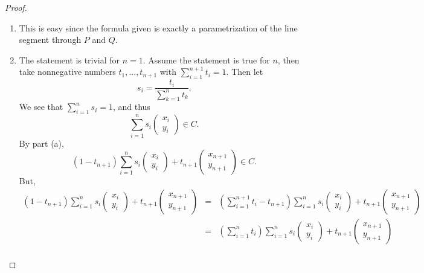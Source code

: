 \begin{proof}
    \begin{enumerate}
        \item This is easy since the formula given is exactly a parametrization of the line segment through $P$ and $Q$.
        \item The statement is trivial for $n=1$. Assume the statement is true for $n$, then take nonnegative numbers $t_1,...,t_{n+1}$ with $\sum_{i=1}^{n+1} t_i = 1$. Then let 
        $$s_i = \frac{t_i}{\sum_{k=1}^n t_k}.$$
        We see that $\sum_{i=1}^n s_i = 1$, and thus
        $$\sum_{i=1}^n s_i \left(\begin{array}{c} x_i\\ y_i\end{array}\right)\in C.$$
        By part (a), 
    $$(1 - t_{n+1})\sum_{i=1}^n s_i \left(\begin{array}{c} x_i\\ y_i\end{array}\right) + t_{n+1}\left(\begin{array}{c} x_{n+1}\\ y_{n+1}\end{array}\right)\in C.$$
    But,
    \begin{eqnarray*}
        (1 - t_{n+1})\sum_{i=1}^n s_i \left(\begin{array}{c} x_i\\ y_i\end{array}\right) + t_{n+1}\left(\begin{array}{c} x_{n+1}\\ y_{n+1}\end{array}\right)
        & = & \left(\sum_{i=1}^{n+1} t_i - t_{n+1}\right)\sum_{i=1}^n s_i \left(\begin{array}{c} x_i\\ y_i\end{array}\right) + t_{n+1}\left(\begin{array}{c} x_{n+1}\\ y_{n+1}\end{array}\right)\\
        & = & \left(\sum_{i=1}^n t_i\right)\sum_{i=1}^n s_i \left(\begin{array}{c} x_i\\ y_i\end{array}\right) + t_{n+1}\left(\begin{array}{c} x_{n+1}\\ y_{n+1}\end{array}\right)\\

\end{eqnarray*}
\end{enumerate}
\end{proof}
